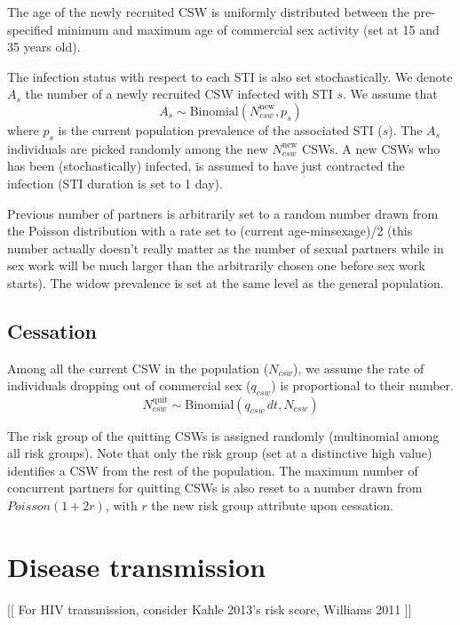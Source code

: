 \documentclass[11pt, onecolumn]{article}
\begin{document}
The age of the newly recruited CSW is uniformly distributed between the pre-specified minimum and maximum age of commercial sex activity (set at 15 and 35 years old).

The infection status with respect to each STI is also set stochastically. We denote $A_s$ the number of a newly recruited CSW infected with STI $s$. We assume that
$$A_s \sim \text{Binomial}(N_{csw}^{\mathrm{new}},p_s)$$
where $p_s$ is the current population prevalence of the associated STI ($s$). The $A_s$ individuals are picked randomly among the new $N_{csw}^{\mathrm{new}}$ CSWs.
A new CSWs who has been (stochastically) infected, is assumed to have just contracted the infection (STI duration is set to 1 day).

Previous number of partners is arbitrarily set to a random number drawn from the Poisson distribution with a rate set to (current age-minsexage)/2 (this number actually doesn't really matter as the number of sexual partners while in sex work will be much larger than the arbitrarily chosen one before sex work starts). 
The widow prevalence is set at the same level as the general population.

\subsection{Cessation}

Among all the current CSW in the population ($N_{csw}$), we assume the rate of individuals dropping out of commercial sex ($q_{csw}$) is proportional to their number.
$$N_{csw}^{\mathrm{quit}} \sim \text{Binomial}\left(q_{csw}\,dt,N_{csw}\right)$$

The risk group of the quitting CSWs is assigned randomly (multinomial among all risk groups). Note that only the risk group (set at a distinctive high value) identifies a CSW from the rest of the population. 
The maximum number of concurrent partners for quitting CSWs is also reset to a number drawn from $Poisson(1+2r)$, with $r$ the new risk group attribute upon cessation.




\section{Disease transmission}

[[ For HIV transmission, consider Kahle 2013's risk score, Williams 2011 ]]
\end{document}
